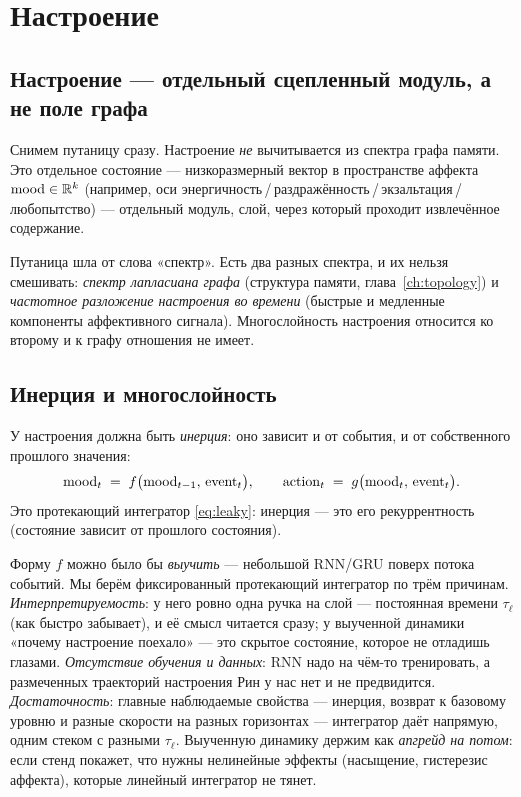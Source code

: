\chapter{Настроение}
\label{ch:mood}

\section{Настроение — отдельный сцепленный модуль, а не поле графа}

Снимем путаницу сразу. Настроение \emph{не} вычитывается из спектра графа памяти.
Это отдельное состояние — низкоразмерный вектор в пространстве аффекта
$\mathrm{mood}\in\mathbb{R}^k$ (например, оси
энергичность\,/\,раздражённость\,/\,экзальтация\,/\,любопытство) — отдельный модуль,
слой, через который проходит извлечённое содержание.

Путаница шла от слова «спектр». Есть два разных спектра, и их нельзя смешивать:
\emph{спектр лапласиана графа} (структура памяти, глава~\ref{ch:topology}) и
\emph{частотное разложение настроения во времени} (быстрые и медленные компоненты
аффективного сигнала). Многослойность настроения относится ко второму и к графу
отношения не имеет.

\section{Инерция и многослойность}

У настроения должна быть \emph{инерция}: оно зависит и от события, и от собственного
прошлого значения:
\begin{equation}
\mathrm{mood}_t \;=\; f\big(\mathrm{mood}_{t-1},\,\text{event}_t\big),\qquad
\text{action}_t \;=\; g\big(\mathrm{mood}_t,\,\text{event}_t\big).
\label{eq:moodinertia}
\end{equation}
Это протекающий интегратор \eqref{eq:leaky}: инерция — это его рекуррентность
(состояние зависит от прошлого состояния).

\begin{intuition}
Форму $f$ можно было бы \emph{выучить} — небольшой RNN/GRU поверх потока событий. Мы
берём фиксированный протекающий интегратор по трём причинам. \emph{Интерпретируемость}:
у него ровно одна ручка на слой — постоянная времени $\tau_\ell$ (как быстро забывает),
и её смысл читается сразу; у выученной динамики «почему настроение поехало» — это
скрытое состояние, которое не отладишь глазами. \emph{Отсутствие обучения и данных}:
RNN надо на чём-то тренировать, а размеченных траекторий настроения Рин у нас нет и не
предвидится. \emph{Достаточность}: главные наблюдаемые свойства — инерция, возврат к
базовому уровню и разные скорости на разных горизонтах — интегратор даёт напрямую,
одним стеком с разными $\tau_\ell$. Выученную динамику держим как \emph{апгрейд на
потом}: если стенд покажет, что нужны нелинейные эффекты (насыщение, гистерезис аффекта),
которые линейный интегратор не тянет.
\end{intuition}

